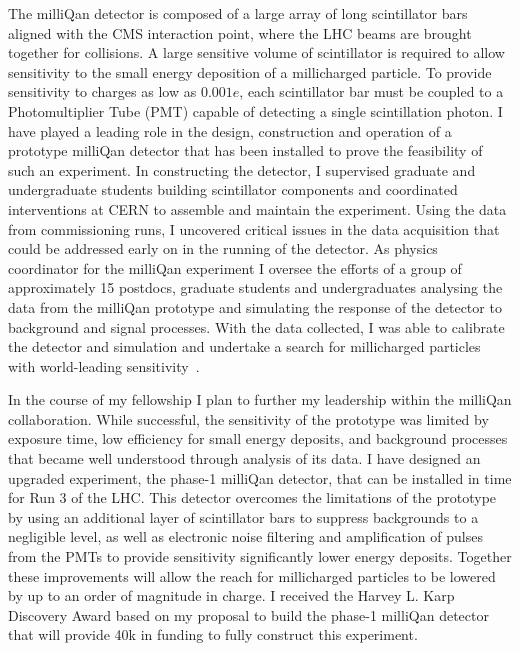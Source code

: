 \documentclass[11pt,a4paper]{article}
\theoremstyle{plain} \numberwithin{equation}{section}
\theoremstyle{definition}
\begin{document}
The milliQan detector is composed of a large array of long scintillator bars
aligned with the CMS interaction point, where the LHC beams are brought together
for collisions. A large sensitive volume of scintillator 
is required to allow sensitivity to the small energy deposition of a millicharged
particle. To provide sensitivity to charges as low 
as $0.001 e$, each scintillator bar must be coupled to a
Photomultiplier Tube (PMT) capable of detecting a single scintillation photon.
I have played a leading role in the design, construction and operation
of a prototype milliQan detector that has been installed to 
prove the feasibility of such an experiment. In constructing the detector, I
supervised graduate and undergraduate students building 
scintillator components and coordinated interventions at CERN to 
assemble and maintain the experiment. Using the data from commissioning runs, 
I uncovered critical issues in the data acquisition that could be 
addressed early on in the running of the detector.
As physics coordinator for the milliQan experiment I oversee
the efforts of a group of approximately 15 postdocs, 
graduate students and undergraduates analysing the data from the milliQan prototype and
simulating the response of the detector to background and signal processes. 
With the data collected, I was able to calibrate the detector and simulation and undertake 
a search for millicharged particles with world-leading sensitivity~\cite{ball2020search}. 

In the course of my fellowship I plan to further my leadership 
within the milliQan collaboration. While successful, the sensitivity 
of the prototype was limited by exposure time, 
low efficiency for small energy deposits,
and background processes that became well understood through analysis of its data.
I have designed an upgraded experiment, the phase-1 milliQan detector, 
that can be installed in time for Run 3 of the LHC. 
This detector overcomes the limitations of the prototype by using
an additional layer of scintillator bars to suppress backgrounds to
a negligible level, as well as electronic noise
filtering and amplification of pulses from the PMTs to provide sensitivity significantly
lower energy deposits. Together these improvements will allow 
the reach for millicharged particles to be lowered by 
up to an order of magnitude in charge. I received the Harvey L. Karp Discovery Award
based on my proposal to build the phase-1 milliQan detector that 
will provide \textsterling40k in funding to 
fully construct this experiment. 
\end{document}
